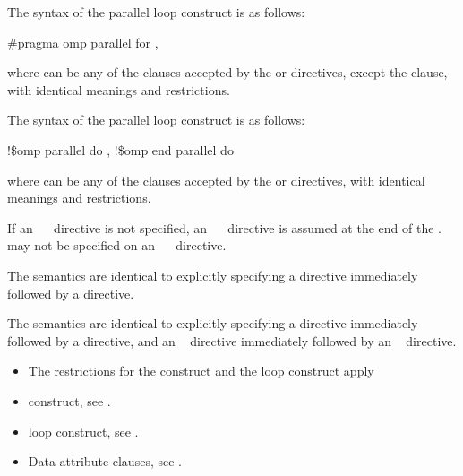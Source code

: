 \syntax
\ccppspecificstart
The syntax of the parallel loop construct is as follows:

\begin{boxedcode}
\#pragma omp parallel for \plc{[clause[ [},\plc{] clause] ... ] new-line}
\end{boxedcode}

where  can be any of the clauses accepted by the  or  directives, 
except the  clause, with identical meanings and restrictions.
\ccppspecificend

\fortranspecificstart
The syntax of the parallel loop construct is as follows:

\begin{boxedcode}
!\$omp parallel do \plc{[clause[ [},\plc{] clause] ... ]}
\plc{[}!\$omp end parallel do\plc{]} 
\end{boxedcode}

where  can be any of the clauses accepted by the  or  directives, 
with identical meanings and restrictions. 

If an ~~ directive is not specified, an ~~ directive is 
assumed at the end of the .  may not be specified on an 
~~ directive.
\fortranspecificend

\descr
\ccppspecificstart
The semantics are identical to explicitly specifying a  directive immediately 
followed by a  directive.
\ccppspecificend

\fortranspecificstart
The semantics are identical to explicitly specifying a  directive immediately 
followed by a  directive, and an ~ directive immediately followed by an 
~ directive. 
\fortranspecificend

\restrictions
\begin{itemize}
\item The restrictions for the  construct and the loop construct apply
\end{itemize}

\crossreferences
\begin{itemize}
\item {} construct, see 
.

\item loop construct, see 
.

\item Data attribute clauses, see 
.
\end{itemize}








